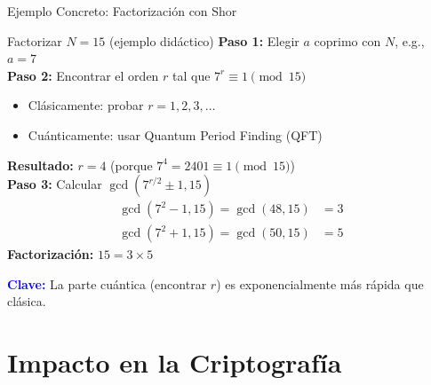 \documentclass[aspectratio=169]{beamer}
\begin{document}
\begin{frame}{Ejemplo Concreto: Factorización con Shor}
\small
\begin{exampleblock}{Factorizar $N = 15$ (ejemplo didáctico)}
\textbf{Paso 1:} Elegir $a$ coprimo con $N$, e.g., $a = 7$\\
\textbf{Paso 2:} Encontrar el orden $r$ tal que $7^r \equiv 1 \pmod{15}$
\begin{itemize}
\item Clásicamente: probar $r=1,2,3,\ldots$
\item Cuánticamente: usar Quantum Period Finding (QFT)
\end{itemize}
\textbf{Resultado:} $r = 4$ (porque $7^4 = 2401 \equiv 1 \pmod{15}$)\\
\textbf{Paso 3:} Calcular $\gcd(7^{r/2} \pm 1, 15)$
\begin{align*}
\gcd(7^2 - 1, 15) = \gcd(48, 15) &= 3 \\
\gcd(7^2 + 1, 15) = \gcd(50, 15) &= 5
\end{align*}
\textbf{Factorización:} $15 = 3 \times 5$ \checkmark
\end{exampleblock}

\textcolor{blue}{\textbf{Clave:}} La parte cuántica (encontrar $r$) es exponencialmente más rápida que clásica.
\end{frame}

\section{Impacto en la Criptografía}
\end{document}

